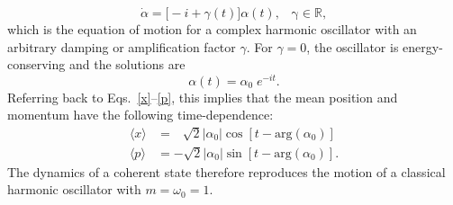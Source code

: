 \documentclass[pra,12pt]{revtex4}
\begin{document}
\begin{equation}
  \dot{\alpha} = \big[-i + \gamma(t)\big] \alpha(t), \;\;\; \mathrm{\gamma}\in\mathbb{R},
\end{equation}
which is the equation of motion for a complex harmonic oscillator with
an arbitrary damping or amplification factor $\gamma$.  For $\gamma =
0$, the oscillator is energy-conserving and the solutions are
\begin{equation}
  \alpha(t) = \alpha_0 \; e^{-it}.
\end{equation}
Referring back to Eqs.~\eqref{x}--\eqref{p}, this implies that the
mean position and momentum have the following time-dependence:
\begin{align}
  \langle x\rangle &=\, \;\;\sqrt{2} |\alpha_0| \cos\left[t - \mathrm{arg}(\alpha_0)\right] \\
  \langle p\rangle &= -\sqrt{2} |\alpha_0| \sin\left[t - \mathrm{arg}(\alpha_0)\right].
\end{align}
The dynamics of a coherent state therefore reproduces the motion of a
classical harmonic oscillator with $m = \omega_0 = 1$.
\end{document}
